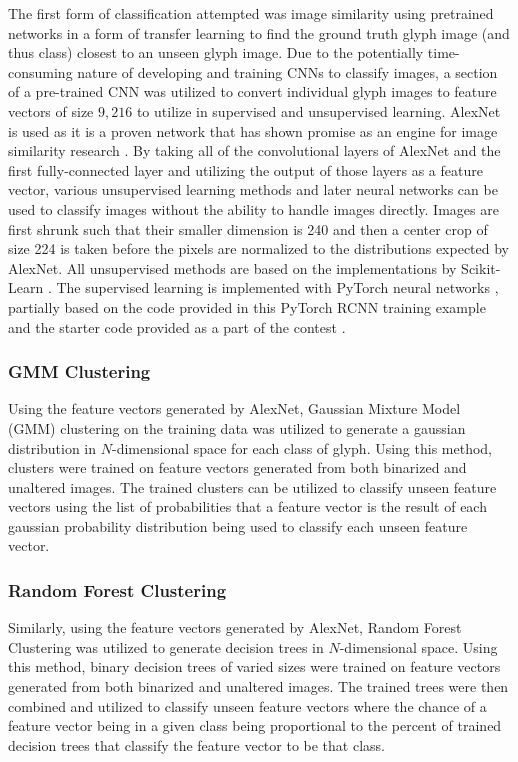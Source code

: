 The first form of classification attempted was image similarity using pretrained networks in a form of transfer learning to find the ground truth glyph image (and thus class) closest to an unseen glyph image. Due to the potentially time-consuming nature of developing and training CNNs to classify images, a section of a pre-trained CNN was utilized to convert individual glyph images to feature vectors of size $9,216$ to utilize in supervised and unsupervised learning. AlexNet \cite{Krizhevsky} is used as it is a proven network that has shown promise as an engine for image similarity research \cite{Vadicamo, Yuan}. By taking all of the convolutional layers of AlexNet and the first fully-connected layer and utilizing the output of those layers as a feature vector, various unsupervised learning methods and later neural networks can be used to classify images without the ability to handle images directly. Images are first shrunk such that their smaller dimension is 240 and then a center crop of size 224 is taken before the pixels are normalized to the distributions expected by AlexNet. All unsupervised methods are based on the implementations by Scikit-Learn \cite{Scikit}. The supervised learning is implemented with PyTorch neural networks \cite{PyTorch}, partially based on the code provided in this PyTorch RCNN training example \cite{PyTorchTutorial} and the starter code provided as a part of the contest \cite{Contest}.

\subsubsection{GMM Clustering}

Using the feature vectors generated by AlexNet, Gaussian Mixture Model (GMM) clustering on the training data was utilized to generate a gaussian distribution in $N$-dimensional space for each class of glyph. Using this method, clusters were trained on feature vectors generated from both binarized and unaltered images. The trained clusters can be utilized to classify unseen feature vectors using the list of probabilities that a feature vector is the result of each gaussian probability distribution being used to classify each unseen feature vector.

\subsubsection{Random Forest Clustering}

Similarly, using the feature vectors generated by AlexNet, Random Forest Clustering was utilized to generate decision trees in $N$-dimensional space. Using this method, binary decision trees of varied sizes were trained on feature vectors generated from both binarized and unaltered images. The trained trees were then combined and utilized to classify unseen feature vectors where the chance of a feature vector being in a given class being proportional to the percent of trained decision trees that classify the feature vector to be that class.

